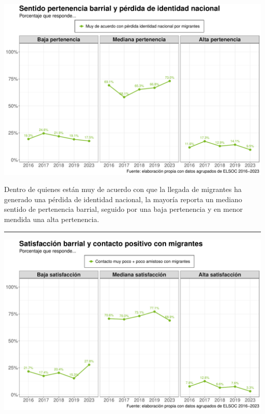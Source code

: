 \documentclass[
  spanish,
  letterpaper,
  DIV=11,
  numbers=noendperiod,
  oneside]{scrartcl}
\begin{document}
\begin{center}
\includegraphics[width=1\linewidth,height=\textheight,keepaspectratio]{cep_2025_files/figure-pdf/unnamed-chunk-7-1.pdf}
\end{center}

Dentro de quienes están muy de acuerdo con que la llegada de migrantes
ha generado una pérdida de identidad nacional, la mayoría reporta un
mediano sentido de pertenencia barrial, seguido por una baja pertenencia
y en menor mendida una alta pertenencia.

\begin{center}\rule{0.5\linewidth}{0.5pt}\end{center}

\begin{center}
\includegraphics[width=1\linewidth,height=\textheight,keepaspectratio]{cep_2025_files/figure-pdf/unnamed-chunk-8-1.pdf}
\end{center}
\end{document}
